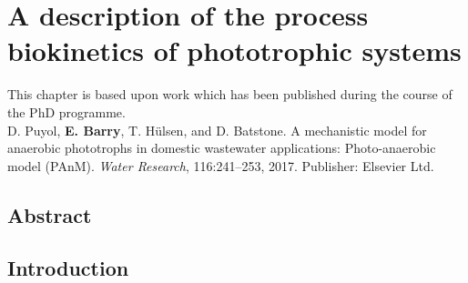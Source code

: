 \chapter[A description of the process biokinetics of phototrophic systems]{A description of the process biokinetics of phototrophic systems}
\label{Chap:chap2}	%
\pagestyle{headings}

This chapter is based upon work which has been published during the course of the PhD programme.\\

D. Puyol, \textbf{E. Barry}, T. H\"{u}lsen, and D. Batstone. A mechanistic model for anaerobic phototrophs
in domestic wastewater applications: Photo-anaerobic model (PAnM).
\textit{Water Research}, 116:241–253, 2017. Publisher: Elsevier Ltd.

\section*{Abstract}


\section{Introduction}
\label{Sec:chap2_intro}

